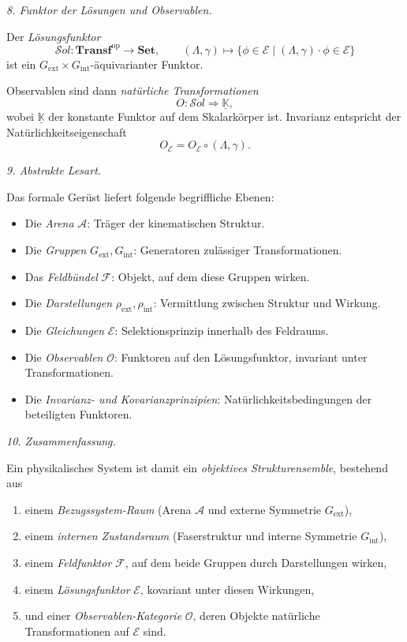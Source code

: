 \documentclass[10pt, letterpaper]{article}
\begin{document}
\bigskip
\emph{8. Funktor der Lösungen und Observablen.}

Der \emph{Lösungsfunktor}
\[
\mathcal{S}ol: \mathbf{Transf}^{\mathrm{op}} \longrightarrow \mathbf{Set},
\qquad
(\Lambda,\gamma)\longmapsto
\{\phi\in\mathcal{E}\mid (\Lambda,\gamma)\cdot\phi\in\mathcal{E}\}
\]
ist ein $G_{\mathrm{ext}}\times G_{\mathrm{int}}$-äquivarianter Funktor.  

Observablen sind dann \emph{natürliche Transformationen}
\[
O:\mathcal{S}ol \Rightarrow \underline{\mathbb{K}},
\]
wobei $\underline{\mathbb{K}}$ der konstante Funktor auf dem Skalarkörper ist.
Invarianz entspricht der Natürlichkeitseigenschaft
\[
O_{\mathcal{E}} = O_{\mathcal{E}}\circ(\Lambda,\gamma).
\]

\bigskip
\emph{9. Abstrakte Lesart.}

Das formale Gerüst liefert folgende begriffliche Ebenen:
\begin{itemize}
\item Die \emph{Arena} $\mathcal{A}$: Träger der kinematischen Struktur.
\item Die \emph{Gruppen} $G_{\mathrm{ext}}, G_{\mathrm{int}}$: Generatoren zulässiger Transformationen.
\item Das \emph{Feldbündel} $\mathcal{F}$: Objekt, auf dem diese Gruppen wirken.
\item Die \emph{Darstellungen} $\rho_{\mathrm{ext}},\rho_{\mathrm{int}}$: Vermittlung zwischen Struktur und Wirkung.
\item Die \emph{Gleichungen} $\mathcal{E}$: Selektionsprinzip innerhalb des Feldraums.
\item Die \emph{Observablen} $\mathcal{O}$: Funktoren auf den Lösungsfunktor, invariant unter Transformationen.
\item Die \emph{Invarianz- und Kovarianzprinzipien}: Natürlichkeitsbedingungen der beteiligten Funktoren.
\end{itemize}

\emph{10. Zusammenfassung.}

Ein physikalisches System ist damit ein \emph{objektives Strukturensemble}, bestehend aus
\begin{enumerate}
\item einem \emph{Bezugssystem-Raum} (Arena $\mathcal{A}$ und externe Symmetrie $G_{\mathrm{ext}}$),
\item einem \emph{internen Zustandsraum} (Faserstruktur und interne Symmetrie $G_{\mathrm{int}}$),
\item einem \emph{Feldfunktor} $\mathcal{F}$, auf dem beide Gruppen durch Darstellungen wirken,
\item einem \emph{Lösungsfunktor} $\mathcal{E}$, kovariant unter diesen Wirkungen,
\item und einer \emph{Observablen-Kategorie} $\mathcal{O}$, deren Objekte natürliche Transformationen auf $\mathcal{E}$ sind.
\end{enumerate}
\end{document}
